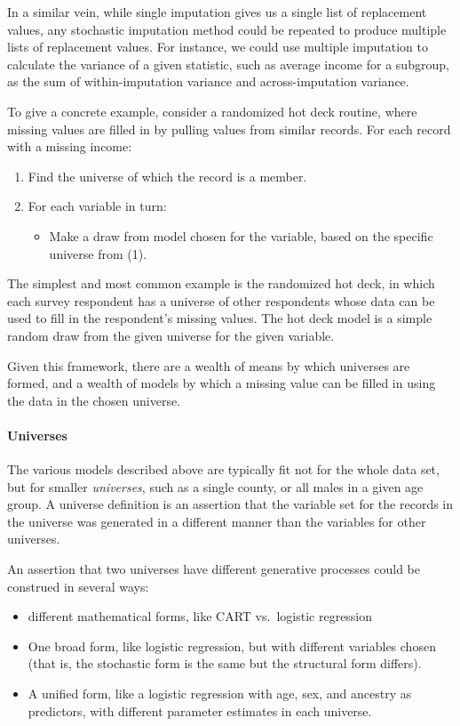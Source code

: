 \documentclass{article}
\def\tighten{ \setlength{\itemsep}{1pt}
    \setlength{\parskip}{0pt}}
\begin{document}
In a similar vein, while single imputation gives us a single list of replacement values, any stochastic 
imputation method could be repeated to produce multiple lists of replacement values. For instance, 
we could use multiple imputation to calculate the variance of a given statistic, such as average 
income for a subgroup, as the sum of within-imputation variance and across-imputation variance.

To give a concrete example, consider a randomized hot deck routine, where missing values are
filled in by pulling values from similar records. For each record with a missing income:
\begin{enumerate}
\tighten
\item Find the universe of which the record is a member.
\item For each variable in turn:
    \begin{itemize}
    \item Make a draw from model chosen for the variable, based on the specific universe from (1).
    \end{itemize}
\end{enumerate}


The simplest and most common example is the randomized hot deck, in which each survey respondent 
has a universe of other respondents whose data can be used to fill in the respondent's missing
values. The hot deck model is a simple random draw from the given universe for the given variable.

Given this framework, there are a wealth of means by which universes are formed, and
a wealth of models by which a missing value can be filled in using the data in the chosen universe.

\paragraph{Universes}
The various models described above are typically fit not for the whole data set, but for
smaller {\em universes}, such as a single county, or all males in a given age group.
A universe definition is an assertion that the variable set for the records in the
universe was generated in a different manner than the variables for other universes.

An assertion that two universes have different generative processes could be construed in
several ways:

\begin{itemize}\tighten
\item different mathematical forms, like CART vs.\ logistic regression
\item One broad form, like logistic regression, but with different variables chosen
    (that is, the stochastic form is the same but the structural form differs).
\item A unified form, like a logistic regression with age, sex, and ancestry
    as predictors, with different parameter estimates in each universe.
\end{itemize}
\end{document}
